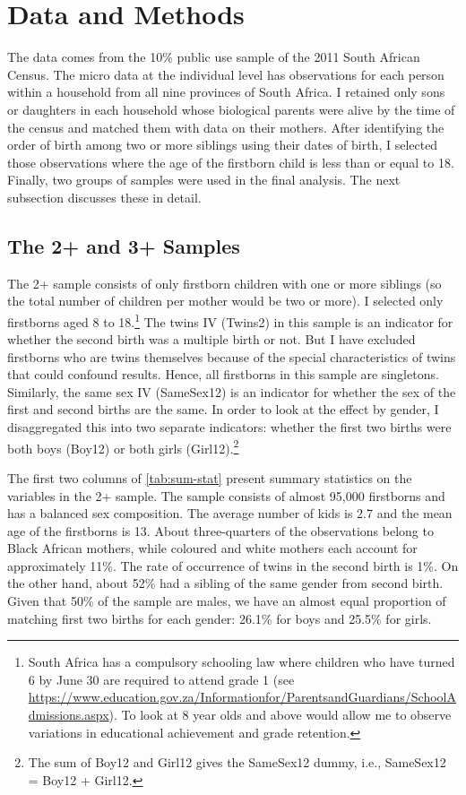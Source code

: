 
\section{Data and Methods}
\label{section:data}

The data comes from the 10\% public use sample of the 2011 South African Census. The micro data at the individual level has observations for each person within a household from all nine provinces of South Africa. I retained only sons or daughters in each household whose biological parents were alive by the time of the census and matched them with data on their mothers. After identifying the order of birth among two or more siblings using their dates of birth, I selected those observations where the age of the firstborn child is less than or equal to 18. Finally, two groups of samples were used in the final analysis. The next subsection discusses these in detail.

\subsection{The 2+ and 3+ Samples}



The 2+ sample consists of only firstborn children with one or more siblings (so the total number of children per mother would be two or more). I selected only firstborns aged 8 to 18.\footnote{ South Africa has a compulsory schooling law where children who have turned 6 by June 30 are required to attend grade 1 (see \url{https://www.education.gov.za/Informationfor/ParentsandGuardians/SchoolAdmissions.aspx}). To look at 8 year olds and above would allow me to observe variations in educational achievement and grade retention. }  The twins IV (Twins2) in this sample is an indicator for whether the second birth was a multiple birth or not. But I have excluded firstborns who are twins themselves because of the special characteristics of twins that could confound results. Hence, all firstborns in this sample are singletons. Similarly, the same sex IV (SameSex12) is an indicator for whether the sex of the first and second births are the same. In order to look at the effect by gender, I disaggregated this into two separate indicators: whether the first two births were both boys (Boy12) or both girls (Girl12).\footnote{ The sum of Boy12 and Girl12 gives the SameSex12 dummy, i.e., SameSex12 = Boy12 + Girl12. }  

The first two columns of \autoref{tab:sum-stat} present summary statistics on the variables in the 2+ sample. The sample consists of almost 95,000 firstborns and has a balanced sex composition. The average number of kids is 2.7 and the mean age of the firstborns is 13. About three-quarters of the observations belong to Black African mothers, while coloured and white mothers each account for approximately 11\%. The rate of occurrence of twins in the second birth is 1\%. On the other hand, about 52\% had a sibling of the same gender from second birth. Given that 50\% of the sample are males, we have an almost equal proportion of matching first two births for each gender: 26.1\% for boys and 25.5\% for girls. 

